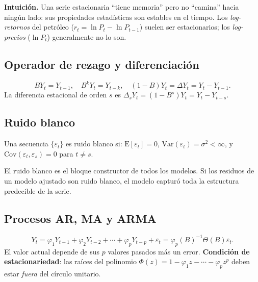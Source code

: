 \documentclass[12pt,a4paper]{article}
\theoremstyle{definition}
\begin{document}
\noindent\textbf{Intuición.} Una serie estacionaria ``tiene memoria'' pero no
``camina'' hacia ningún lado: sus propiedades estadísticas son estables en el
tiempo. Los \emph{log-retornos} del petróleo ($r_t = \ln P_t - \ln P_{t-1}$)
suelen ser estacionarios; los \emph{log-precios} ($\ln P_t$) generalmente no lo
son.

\subsection{Operador de rezago y diferenciación}

\begin{defbox}
\[
  B Y_t = Y_{t-1}, \quad B^k Y_t = Y_{t-k}, \quad (1-B)Y_t = \Delta Y_t = Y_t - Y_{t-1}.
\]
La diferencia estacional de orden $s$ es $\Delta_s Y_t = (1-B^s)Y_t = Y_t - Y_{t-s}$.
\end{defbox}

\subsection{Ruido blanco}

\begin{defbox}
Una secuencia $\{\varepsilon_t\}$ es ruido blanco si:
$\mathrm{E}[\varepsilon_t]=0$, $\mathrm{Var}(\varepsilon_t)=\sigma^2 < \infty$,
y $\mathrm{Cov}(\varepsilon_t, \varepsilon_s)=0$ para $t \neq s$.
\end{defbox}

\noindent El ruido blanco es el bloque constructor de todos los modelos. Si los
residuos de un modelo ajustado son ruido blanco, el modelo capturó toda la
estructura predecible de la serie.

\subsection{Procesos AR, MA y ARMA}

\begin{defbox}[AR($p$) --- Autorregresivo]
\[
  Y_t = \varphi_1 Y_{t-1} + \varphi_2 Y_{t-2} + \cdots + \varphi_p Y_{t-p} + \varepsilon_t
  = \varphi_p(B)^{-1}\Theta(B)\varepsilon_t.
\]
El valor actual depende de sus $p$ valores pasados más un error.
\textbf{Condición de estacionariedad}: las raíces del polinomio
$\Phi(z) = 1 - \varphi_1 z - \cdots - \varphi_p z^p$ deben estar \emph{fuera}
del círculo unitario.
\end{defbox}
\end{document}
